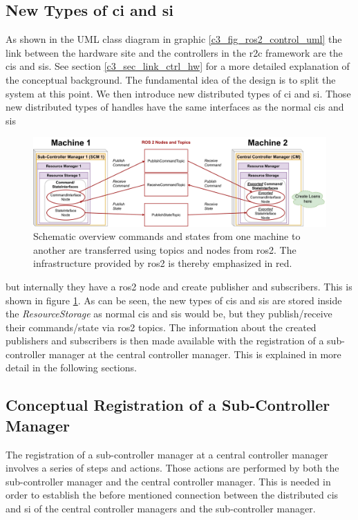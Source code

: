 \subsection{New Types of \gls{ci} and \gls{si}}
As shown in the UML class diagram in graphic \ref{c3_fig_ros2_control_uml} the link between the hardware site and the controllers in the \gls{r2c} framework are the \glspl{ci} and \glspl{si}. See section \ref{c3_sec_link_ctrl_hw} for a more detailed explanation of the conceptual background. \newline
The fundamental idea of the design is to split the system at this point. We then introduce new distributed types of \gls{ci} and \gls{si}. Those new distributed types of handles have the same interfaces as the normal \glspl{ci} and \glspl{si} 
\begin{figure}[htbp]
	\centering
    \includegraphics[width=1\textwidth]{Figures/C4/simple_concept.drawio.pdf}
	\caption{Schematic overview commands and states from one machine to another are transferred using topics and nodes from \gls{ros2}. The infrastructure provided by \gls{ros2} is thereby emphasized in red.}
	\label{c4_fig_simple_concept}
\end{figure}
but internally they have a \gls{ros2} node and create publisher and subscribers. This is shown in figure \ref{c4_fig_simple_concept}. As can be seen, the new types of \glspl{ci} and \glspl{si} are stored inside the \textit{ResourceStorage} as normal \glspl{ci} and \glspl{si} would be, but they publish/receive their commands/state via \gls{ros2} topics. The information about the created publishers and subscribers is then made available with the registration of a sub-controller manager at the central controller manager. This is explained in more detail in the following sections.

\subsection{Conceptual Registration of a Sub-Controller Manager}\label{c4_sec_registraion_csi}
The registration of a sub-controller manager at a central controller manager involves a series of steps and actions. Those actions are performed by both the sub-controller manager and the central controller manager. This is needed in order to establish the before mentioned connection between the distributed \glspl{ci} and \gls{si} of the central controller managers and the sub-controller manager.

